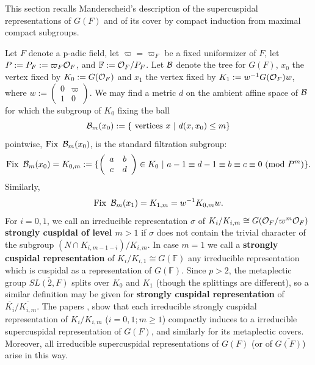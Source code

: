 \documentclass[12pt,letterpaper]{book}
\theoremstyle{plain}
\theoremstyle{definition}
\theoremstyle{remark}
\theoremstyle{remark}
\begin{document}
This section recalls Manderscheid's description of the supercuspidal representations of $G(F)$ and of its cover by compact induction from maximal compact subgroups.


Let
$F$ denote a p-adic field, let
$\varpi =\varpi_F$ be a fixed uniformizer of $F$, let $P:=P_F:=\varpi_F{\cal{O}}_F$,
and ${\mathbb{F}} :={\cal{O}}_F/P_F$.
Let ${\cal{B}}$ denote the tree for $G(F)$, $x_0$ the vertex fixed by
$K_0:=G({\cal{O}}_F)$ and $x_1$ the vertex fixed by $
K_1:=w^{-1}G({\cal{O}}_F)w$, where
$w:=
\left(\begin{array}{cc}
0&\varpi \\ 1& 0\end{array}\right)$.
We may find a metric $d$ on the ambient affine space of ${\cal{B}}$
for which the subgroup of $K_0$ fixing the ball
\begin{equation}
{\cal{B}}_m(x_0):=\{\text{ vertices }x\ |\ d(x,x_0)\leq m\}
\end{equation}
pointwise, $\operatorname{Fix}\ {\cal{B}}_m(x_0)$, is the standard filtration subgroup:
\begin{equation}
\operatorname{Fix}\ {\cal{B}}_m(x_0)=K_{0,m}:=
\{\left(\begin{array}{cc} a&b \\ c& d\end{array}\right)\in K_0\ |\
a-1\equiv d-1\equiv b\equiv c\equiv 0\  ({\rm mod\ } P^m)\}.
\end{equation}
Similarly,
\begin{equation}
\operatorname{Fix}\ {\cal{B}}_m(x_1)=K_{1,m}=w^{-1}K_{0,m}w.
\end{equation}
For $i=0,1$, we call an irreducible representation $\sigma$ of
$K_i/K_{i,m}\cong G({\cal{O}}_F/\varpi^m{\cal{O}}_F)$
{\bf strongly cuspidal of level $m>1$} if
$\sigma$ does not contain the trivial character
of the subgroup $(N\cap K_{i,m-1-i})/K_{i,m}$. In case $m=1$ we call a
{\bf strongly cuspidal representation} of
$K_i/K_{i,1}\cong G({\mathbb{F}})$
any irreducible representation which is cuspidal as a representation of
$G({\mathbb{F}})$. Since $p> 2$, the metaplectic group
$\overline{SL(2,F)}$ splits over $K_0$ and $K_1$ (though the splittings
are different), so a similar definition may be given for
{\bf strongly cuspidal representation} of
$\overline{K_i}/\overline{K_{i,m}}$. The papers \cite{M1},
\cite{M2} show that each irreducible strongly cuspidal representation
of $K_i/K_{i,m}$ ($i=0,1;m\geq 1$) compactly induces to a irreducible
supercuspidal representation of $G(F)$, and similarly for its metaplectic
covers. Moreover, all irreducible supercuspidal representations
of $G(F)$ (or of $\overline{G(F)}$) arise in this way.
\end{document}
